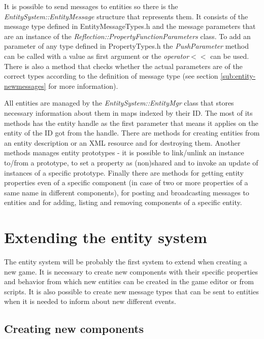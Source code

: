 It is possible to send messages to entities so there is the \emph{EntitySystem::EntityMessage} structure that represents them. It consists of the message type defined in EntityMessageTypes.h and the message parameters that are an instance of the \emph{Reflection::PropertyFunctionParameters} class. To add an parameter of any type defined in PropertyTypes.h the \emph{PushParameter} method can be called with a value as first argument or the \emph{operator}$<<$ can be used. There is also a method that checks whether the actual parameters are of the correct types according to the definition of message type (see section \ref{sub:entity-newmessages} for more information).

All entities are managed by the \emph{EntitySystem::EntityMgr} class that stores necessary information about them in maps indexed by their ID. The most of its methods has the entity handle as the first parameter that means it applies on the entity of the ID got from the handle. There are methods for creating entities from an entity description or an XML resource and for destroying them. Another methods manages entity prototypes - it is possible to link/unlink an instance to/from a prototype, to set a property as (non)shared and to invoke an update of instances of a specific prototype. Finally there are methods for getting entity properties even of a specific component (in case of two or more properties of a same name in different components), for posting and broadcasting messages to entities and for adding, listing and removing components of a specific entity.


\section{Extending the entity system}

The entity system will be probably the first system to extend when creating a new game. It is necessary to create new components with their specific properties and behavior from which new entities can be created in the game editor or from scripts. It is also possible to create new message types that can be sent to entities when it is needed to inform about new different events.

\subsection{Creating new components}
\label{sub:entity-newcomponents}

